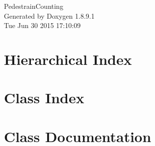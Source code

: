 \documentclass[twoside]{book}
\newcommand{\+}{\discretionary{\mbox{\scriptsize$\hookleftarrow$}}{}{}}
\newcommand{\clearemptydoublepage}{%
  \newpage{\pagestyle{empty}\cleardoublepage}%
}
\begin{document}
\hypersetup{pageanchor=false,
             bookmarks=true,
             bookmarksnumbered=true,
             pdfencoding=unicode
            }
\begin{titlepage}
\vspace*{7cm}
\begin{center}%
{\Large Pedestrain\+Counting }\\
\vspace*{1cm}
{\large Generated by Doxygen 1.8.9.1}\\
\vspace*{0.5cm}
{\small Tue Jun 30 2015 17:10:09}\\
\end{center}
\end{titlepage}
\clearemptydoublepage
\tableofcontents
\clearemptydoublepage
{}
\hypersetup{pageanchor=true}

\chapter{Hierarchical Index}

\chapter{Class Index}

\chapter{Class Documentation}

















































\backmatter
\newpage
{}
\clearemptydoublepage
{}
\printindex
\end{document}

